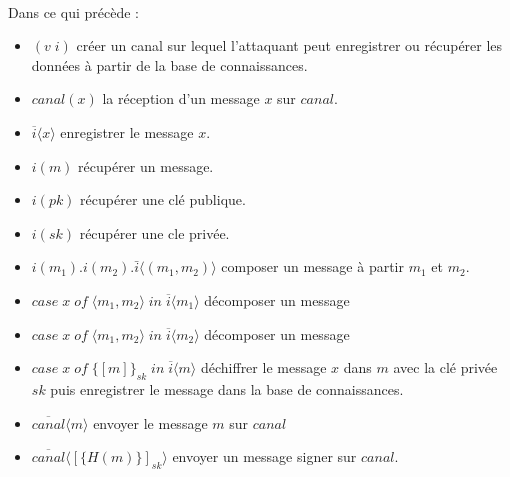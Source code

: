 \documentclass[10pt,a4paper]{article}
\begin{document}
\paragraph{}
Dans ce qui précède :
\begin{itemize}
\item $(v\;i)$ créer un canal sur lequel l'attaquant peut enregistrer ou récupérer les données à partir de la base de connaissances.
\item $canal(x)$ la réception d'un message $x$ sur $canal$.
\item $\overline{i}\langle x \rangle$ enregistrer le message $x$.
\item $i(m)$ récupérer un message. 
\item $i(pk)$ récupérer une clé publique.
\item $i(sk)$ récupérer une cle privée.
\item $i(m_{1}).i(m_{2}).\bar{i}\langle (m_{1},m_{2}) \rangle$ composer un message à partir ${m}_{1}$ et ${m}_{2}$.
\item $case\;x\;of\; \langle m_1,m_2\rangle\; in\; \overline{i}\langle m_1 \rangle$ décomposer un message
\item $case\;x\;of\; \langle m_1,m_2\rangle\; in\; \overline{i}\langle m_2 \rangle$ décomposer un message
\item $case\; x\; of\; {\lbrace [m]\rbrace}_{sk}\;in\;\overline{i}\langle m\rangle$ déchiffrer le message $x$ dans $m$ avec la clé privée $sk$ puis enregistrer le message dans la base de connaissances.
\item $\overline{canal}\langle m\rangle$ envoyer le message $m$ sur $canal$
\item $\overline{canal}\langle{[\lbrace H(m)\rbrace]}_{sk} \rangle$ envoyer un message signer sur $canal$.
\end{itemize}
\end{document}
